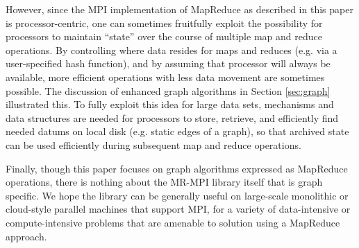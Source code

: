 However, since the MPI implementation of MapReduce as described in
this paper is processor-centric, one can sometimes fruitfully exploit
the possibility for processors to maintain ``state'' over the course
of multiple map and reduce operations.  By controlling where data
resides for maps and reduces (e.g. via a user-specified hash
function), and by assuming that processor will always be available,
more efficient operations with less data movement are sometimes
possible.  The discussion of enhanced graph algorithms in Section
\ref{sec:graph} illustrated this.  To fully exploit this idea for
large data sets, mechanisms and data structures are needed for
processors to store, retrieve, and efficiently find needed datums on
local disk (e.g. static edges of a graph), so that archived state can
be used efficiently during subsequent map and reduce operations.

Finally, though this paper focuses on graph algorithms expressed as
MapReduce operations, there is nothing about the MR-MPI library itself
that is graph specific.  We hope the library can be generally useful
on large-scale monolithic or cloud-style parallel machines that
support MPI, for a variety of data-intensive or compute-intensive
problems that are amenable to solution using a MapReduce approach.
